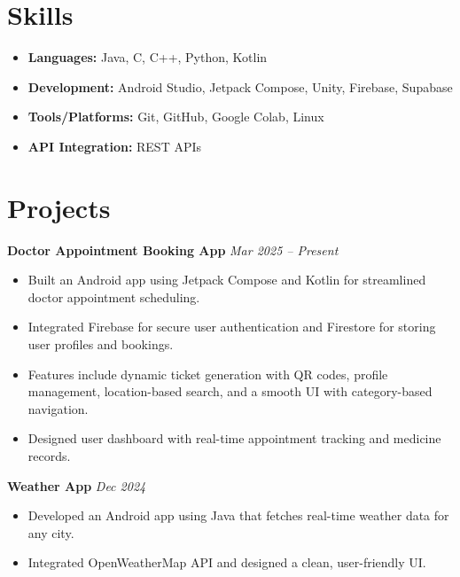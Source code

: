 \documentclass[a4paper,10pt]{article}
\begin{document}
\section*{Skills}

\begin{multicols}{2}
\begin{itemize}[leftmargin=*, itemsep=1pt]
    \item \textbf{Languages:} Java, C, C++, Python, Kotlin
    \item \textbf{Development:} Android Studio, Jetpack Compose, Unity, Firebase, Supabase
    \item \textbf{Tools/Platforms:} Git, GitHub, Google Colab, Linux
    \item \textbf{API Integration:} REST APIs

\end{itemize}
\end{multicols}



\section*{Projects}

\textbf{Doctor Appointment Booking App} \hfill \textit{Mar 2025 – Present} \\
\begin{itemize}[leftmargin=*, itemsep=1pt]
    \item Built an Android app using Jetpack Compose and Kotlin for streamlined doctor appointment scheduling.
    \item Integrated Firebase for secure user authentication and Firestore for storing user profiles and bookings.
    \item Features include dynamic ticket generation with QR codes, profile management, location-based search, and a smooth UI with category-based navigation.
    \item Designed user dashboard with real-time appointment tracking and medicine records.
\end{itemize}

\textbf{Weather App} \hfill \textit{Dec 2024} \\
\begin{itemize}[leftmargin=*, itemsep=1pt]
    \item Developed an Android app using Java that fetches real-time weather data for any city.
    \item Integrated OpenWeatherMap API and designed a clean, user-friendly UI.
\end{itemize}
\end{document}
